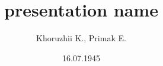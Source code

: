 \documentclass[]{beamer}
\title[name]{presentation name}
\author{
Khoruzhii K., Primak E.}
\institute[MIPT]
\begin{document}
\date{16.07.1945}
\maketitle

\end{document}
